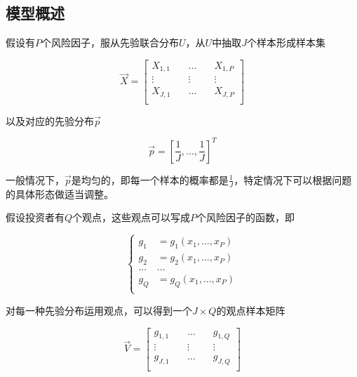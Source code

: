 \subsection{模型概述}

假设有$P$个风险因子，服从先验联合分布$U$，从$U$中抽取$J$个样本形成样本集

\begin{equation}
    \vec{X} = \left[
        \begin{aligned}
            X_{1,1} & \quad ...    & \quad X_{1,P} \\
            \vdots  & \quad \vdots & \quad \vdots  \\
            X_{J,1} & \quad ...    & \quad X_{J,P} \\
        \end{aligned}
        \right]
\end{equation}

以及对应的先验分布$\vec{p}$

\begin{equation}
    \vec{p} = [\frac{1}{J},...,\frac{1}{J}]^T
\end{equation}

一般情况下，$\vec{p}$是均匀的，即每一个样本的概率都是$\frac{1}{J}$，特定情况下可以根据问题的具体形态做适当调整。

假设投资者有$Q$个观点，这些观点可以写成$P$个风险因子的函数，即

\begin{equation}
    \left\{
    \begin{aligned}
        g_1 & = g_1(x_1,...,x_P) \\
        g_2 & = g_2(x_1,...,x_P) \\
        ... & ...                \\
        g_Q & = g_Q(x_1,...,x_P) \\
    \end{aligned}
    \right.
\end{equation}

对每一种先验分布运用观点，可以得到一个$J\times Q$的观点样本矩阵

\begin{equation}
    \vec{V} = \left[
        \begin{aligned}
            g_{1,1} & \quad ...    & \quad g_{1,Q} \\
            \vdots  & \quad \vdots & \quad \vdots  \\
            g_{J,1} & \quad ...    & \quad g_{J,Q} \\
        \end{aligned}
        \right]
\end{equation}

